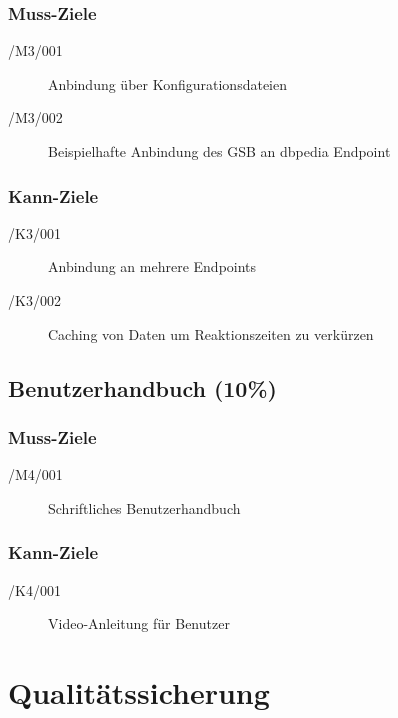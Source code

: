 \subsubsection*{Muss-Ziele}

\begin{description}
\item[/M3/001] Anbindung über Konfigurationsdateien
\item[/M3/002] Beispielhafte Anbindung des GSB an dbpedia Endpoint 
\end{description}

\subsubsection*{Kann-Ziele}

\begin{description}
\item[/K3/001] Anbindung an mehrere Endpoints
\item[/K3/002] Caching von Daten um Reaktionszeiten zu verkürzen
\end{description}

\subsection*{Benutzerhandbuch (10\%)}
 
\subsubsection*{Muss-Ziele}

\begin{description}
\item[/M4/001] Schriftliches Benutzerhandbuch
\end{description}

\subsubsection*{Kann-Ziele}

\begin{description}
\item[/K4/001] Video-Anleitung für Benutzer
\end{description}

\section{Qualitätssicherung}

